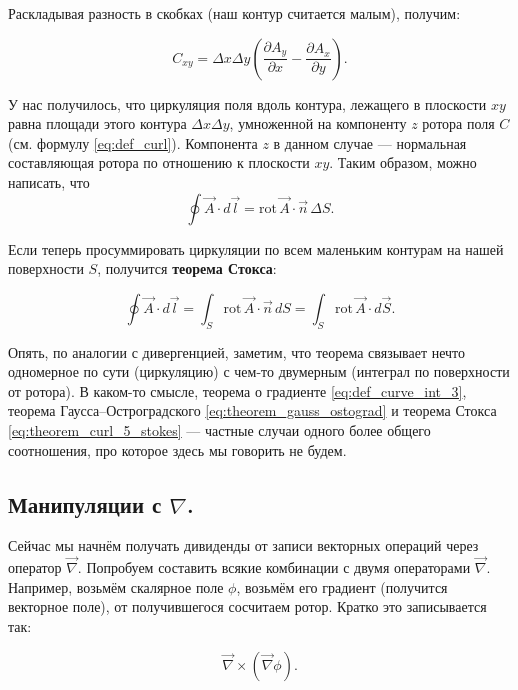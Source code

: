 \documentclass[a4paper,12pt]{article}
\numberwithin{equation}{section}
\newcommand{\pt}{\partial}
\newcommand{\rot}{\mathrm{rot}\,}
\newcommand{\vn}{\vec{\nabla}}
\begin{document}
Раскладывая разность в скобках (наш контур считается малым), получим:

\begin{equation}
  \label{eq:theorem_curl_3}
  C_{xy} = \Delta x \Delta y \left(\frac{\pt A_y}{\pt x} - \frac{\pt A_x}{\pt y}\right).
\end{equation}

У нас получилось, что циркуляция поля вдоль контура, лежащего в
плоскости $xy$ равна площади этого контура $\Delta x \Delta y$,
умноженной на компоненту $z$ ротора поля $C$ (см. формулу
\eqref{eq:def_curl}). Компонента $z$ в данном случае --- нормальная
составляющая ротора по отношению к плоскости $xy$. Таким образом,
можно написать, что
\begin{equation}
  \label{eq:theorem_curl_4}
  \oint \vec{A} \cdot d\vec{l} = \rot \vec{A} \cdot \vec{n}\, \Delta S.
\end{equation}

Если теперь просуммировать циркуляции по всем маленьким контурам на
нашей поверхности $S$, получится \textbf{теорема Стокса}:

\begin{equation}
  \label{eq:theorem_curl_5_stokes}
  \oint \vec{A} \cdot d \vec{l} = \int_S \rot \vec{A} \cdot \vec{n} \,
  dS = \int_S \rot \vec{A} \cdot d\vec{S}.
\end{equation}

Опять, по аналогии с дивергенцией, заметим, что теорема связывает
нечто одномерное по сути (циркуляцию) с чем-то двумерным (интеграл по
поверхности от ротора). В каком-то смысле, теорема о градиенте
\eqref{eq:def_curve_int_3}, теорема Гаусса--Остроградского
\eqref{eq:theorem_gauss_ostograd} и теорема Стокса
\eqref{eq:theorem_curl_5_stokes} --- частные случаи одного более
общего соотношения, про которое здесь мы говорить не будем. 

\subsection{Манипуляции с $\nabla$.}
\label{sec:nabla}

Сейчас мы начнём получать дивиденды от записи векторных операций через
оператор $\vn$. Попробуем составить всякие комбинации с двумя
операторами $\vn$. Например, возьмём скалярное поле $\phi$, возьмём
его градиент (получится векторное поле), от получившегося сосчитаем
ротор. Кратко это записывается так:

\begin{equation}
  \vn \times (\vn \phi).
\end{equation}
\end{document}

